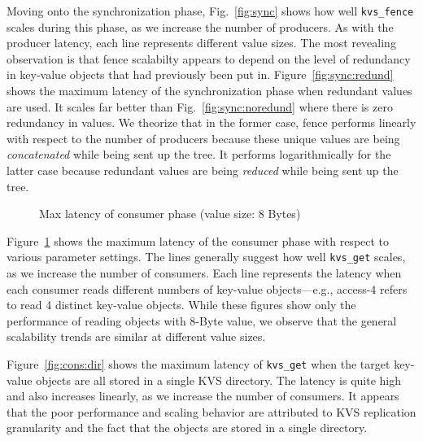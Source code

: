 Moving onto the synchronization phase, Fig.~\ref{fig:sync} shows 
how well {\tt kvs\_fence} scales during this phase,
as we increase the number of producers. 
As with the producer latency,
each line represents different value sizes.  
The most revealing observation is that 
fence scalabilty appears to depend on the level of
redundancy in key-value objects that had previously 
been put in. Figure~\ref{fig:sync:redund} 
shows the maximum latency of the synchronization phase
when redundant values are used. It scales
far better than Fig.~\ref{fig:sync:noredund}
where there is zero redundancy in values. 
We theorize that in the former case, fence performs linearly with respect to the number of
producers because these unique values are being {\em concatenated} while
being sent up the tree. It performs logarithmically for the latter case
because redundant values are being {\em reduced} while being sent 
up the tree. %


\begin{figure}[ht]
\centering
\begin{subfigure}[With single-directory layout]{
  \texttt{[image: consumer-1-dir]}
  \label{fig:cons:dir}
}%
\end{subfigure}
\begin{subfigure}[Improvements with multiple directories]{
  \texttt{[image: consumer-dist-dir]}
  \label{fig:cons:dirs}
}%
\end{subfigure}
\caption{Max latency of consumer phase (value size: 8 Bytes)}
\vspace{-.5cm}
\label{fig:consumer}
\end{figure}

Figure~\ref{fig:consumer} shows the maximum latency of the consumer
phase with respect to various parameter settings. 
The lines generally suggest how well {\tt kvs\_get}
scales, as we increase the number of consumers. Each line represents
the latency when each consumer reads different numbers of 
key-value objects---e.g., access-4 refers to read 4 distinct key-value 
objects. While these figures show only the performance of reading
objects with 8-Byte value, we observe that the general 
scalability trends are similar at different value sizes.

Figure~\ref{fig:cons:dir} shows the maximum latency of {\tt kvs\_get}
when the target key-value objects are all stored in a single
KVS directory. The latency is quite high and also increases
linearly, as we increase the number of consumers. 
It appears that the poor performance and scaling behavior 
are attributed to KVS replication granularity and 
the fact that the objects are stored in a single directory.

